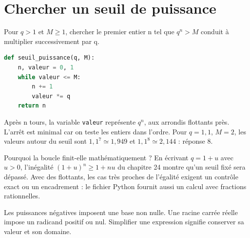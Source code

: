 \documentclass[../cours_2de.tex]{subfiles}
\begin{document}
\section{Chercher un seuil de puissance}
Pour $q>1$ et $M\ge1$, chercher le premier entier n tel que $q^n>M$ conduit à multiplier successivement par q.
\begin{lstlisting}[language=Python]
def seuil_puissance(q, M):
    n, valeur = 0, 1
    while valeur <= M:
        n += 1
        valeur *= q
    return n
\end{lstlisting}
Après n tours, la variable \texttt{valeur} représente $q^n$, aux arrondis flottants près. L'arrêt est minimal car on teste les entiers dans l'ordre. Pour $q=1{,}1$, $M=2$, les valeurs autour du seuil sont $1{,}1^7\simeq1{,}949$ et $1{,}1^8\simeq2{,}144$ : réponse $8$.

Pourquoi la boucle finit-elle mathématiquement ? En écrivant $q=1+u$ avec $u>0$, l'inégalité $(1+u)^n\ge1+nu$ du chapitre 24 montre qu'un seuil fixé sera dépassé. Avec des flottants, les cas très proches de l'égalité exigent un contrôle exact ou un encadrement : le fichier Python fournit aussi un calcul avec fractions rationnelles.
\begin{retenir}
Les puissances négatives imposent une base non nulle. Une racine carrée réelle impose un radicand positif ou nul. Simplifier une expression signifie conserver sa valeur et son domaine.
\end{retenir}
\end{document}
